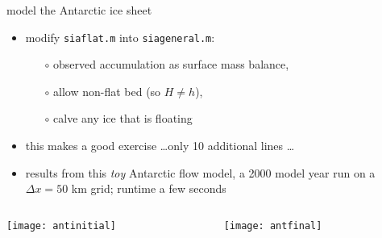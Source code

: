 \begin{frame}{model the Antarctic ice sheet}

\normalsize
\begin{itemize}
\item modify \texttt{siaflat.m} into \texttt{siageneral.m}:
  \begin{itemize}
  \item[$\circ$] observed accumulation as surface mass balance,
  \item[$\circ$] allow non-flat bed (so $H\ne h$),
  \item[$\circ$] calve any ice that is floating
  \end{itemize}
\item this makes a good exercise \dots only 10 additional lines \dots
\item results from this \emph{toy} Antarctic flow model, a 2000 model year run on a $\Delta x=50$ km grid; runtime a few seconds
\end{itemize}

\bigskip

\begin{columns}
\begin{column}{0.4\textwidth}
\texttt{[image: antinitial]}
\end{column}
\begin{column}{0.55\textwidth}
\texttt{[image: antfinal]}
\end{column}
\end{columns}
\end{frame}
